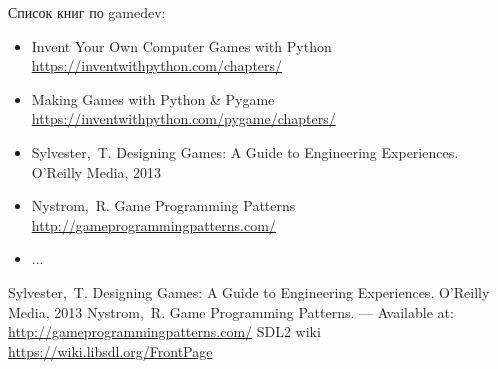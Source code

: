 Список книг по gamedev:
\begin{itemize}
    \item Invent Your Own Computer Games with Python \url{https://inventwithpython.com/chapters/}
    \item Making Games with Python & Pygame \url{https://inventwithpython.com/pygame/chapters/}
    \item Sylvester,~T. Designing Games: A Guide to Engineering Experiences. O'Reilly Media, 2013
    \item Nystrom,~R. Game Programming Patterns \url{http://gameprogrammingpatterns.com/}
    \item ...
\end{itemize}

\renewcommand{\bibname}{Список используемой литературы}
\begin{thebibliography}{10}
     Sylvester,~T. Designing Games: A Guide to Engineering Experiences. O'Reilly Media, 2013 
     Nystrom,~R. Game Programming Patterns. --- Available at: 
        \url{http://gameprogrammingpatterns.com/}
     SDL2 wiki \url{https://wiki.libsdl.org/FrontPage}
\end{thebibliography}